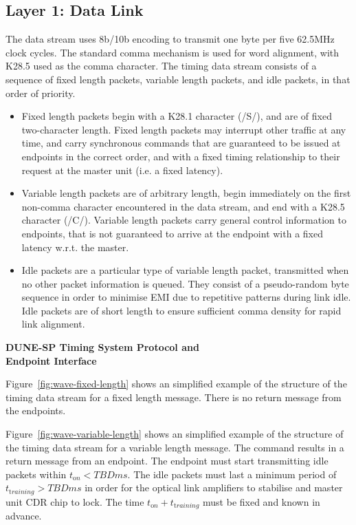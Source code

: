 \documentclass[a4paper,11pt]{article}
\begin{document}
\subsection{Layer 1: Data Link}

The data stream uses 8b/10b encoding to transmit one byte per five 62.5MHz clock cycles. The standard comma mechanism is used for word alignment, with K28.5 used as the comma character. The timing data stream consists of a sequence of fixed length packets, variable length packets, and idle packets, in that order of priority.

\begin{itemize}
	\item Fixed length packets begin with a K28.1 character (/S/), and are of fixed two-character length. Fixed length packets may interrupt other traffic at any time, and carry synchronous commands that are guaranteed to be issued at endpoints in the correct order, and with a fixed timing relationship to their request at the master unit (i.e. a fixed latency).
	\item Variable length packets are of arbitrary length, begin immediately on the first non-comma character encountered in the data stream, and end with a K28.5 character (/C/). Variable length packets carry general control information to endpoints, that is not guaranteed to arrive at the endpoint with a fixed latency w.r.t. the master.
	\item Idle packets are a particular type of variable length packet, transmitted when no other packet information is queued. They consist of a pseudo-random byte sequence in order to minimise EMI due to repetitive patterns during link idle. Idle packets are of short length to ensure sufficient comma density for rapid link alignment.
\end{itemize}

{\LARGE\bf DUNE-SP Timing System Protocol and\\ Endpoint Interface}

Figure~\ref{fig:wave-fixed-length} shows an simplified example of the structure of the timing data stream for a fixed length message. There is no return message from the endpoints. 

Figure~\ref{fig:wave-variable-length} shows an simplified example of the structure of the timing data stream for a variable length message. The command results in a return message from an endpoint. The endpoint must start transmitting idle packets within $t_{\mathrm on} < TBD ms$. The idle packets must last a minimum period of $t_{\mathrm training} > TBD ms$ in order for the optical link amplifiers to stabilise and master unit CDR chip to lock. The time $t_{\mathrm on}  + t_{\mathrm training}$ must be fixed and known in advance.
\end{document}
